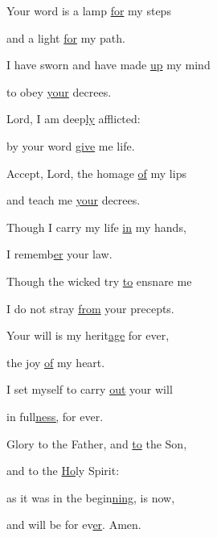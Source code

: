 \noindent Your word is a lamp \uline{for} my steps ~\GreStar{}~\nopagebreak

and a light \uline{for} my path.

\noindent I have sworn and have made \uline{up} my mind ~\GreStar{}~\nopagebreak

to obey \uline{your} decrees.

\noindent Lord, I am deep\uline{ly} afflicted: ~\GreStar{}~\nopagebreak

by your word \uline{give} me life.

\noindent Accept, Lord, the homage \uline{of} my lips ~\GreStar{}~\nopagebreak

and teach me \uline{your} decrees.

\noindent Though I carry my life \uline{in} my hands, ~\GreStar{}~\nopagebreak

I rememb\uline{er} your law.

\noindent Though the wicked try \uline{to} ensnare me ~\GreStar{}~\nopagebreak

I do not stray \uline{from} your precepts.

\noindent Your will is my herit\uline{age} for ever, ~\GreStar{}~\nopagebreak

the joy \uline{of} my heart.

\noindent I set myself to carry \uline{out} your will ~\GreStar{}~\nopagebreak

in full\uline{ness,} for ever.



\noindent Glory to the Father, and \uline{to} the Son,~\GreStar{}~\nopagebreak

and to the \uline{Ho}ly Spirit:

\noindent as it was in the begin\uline{ning}, is now,~\GreStar{}~\nopagebreak

and will be for ev\uline{er}. Amen.
